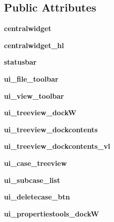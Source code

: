 \subsection*{Public Attributes}
\begin{DoxyCompactItemize}
\item 
\hypertarget{a00105_a2a323cc6e8e271345a42cb3342820d3b}{}\label{a00105_a2a323cc6e8e271345a42cb3342820d3b} 
{\bfseries centralwidget}
\item 
\hypertarget{a00105_a84fbe4915db0698d6779bab59a55b20a}{}\label{a00105_a84fbe4915db0698d6779bab59a55b20a} 
{\bfseries centralwidget\+\_\+hl}
\item 
\hypertarget{a00105_a840ced767970f65402ef894fb5fcc3f3}{}\label{a00105_a840ced767970f65402ef894fb5fcc3f3} 
{\bfseries statusbar}
\item 
\hypertarget{a00105_aa1bd7f326134cd7873cadb8a3e89d866}{}\label{a00105_aa1bd7f326134cd7873cadb8a3e89d866} 
{\bfseries ui\+\_\+file\+\_\+toolbar}
\item 
\hypertarget{a00105_ada862a642c3a9c359564a67539047d12}{}\label{a00105_ada862a642c3a9c359564a67539047d12} 
{\bfseries ui\+\_\+view\+\_\+toolbar}
\item 
\hypertarget{a00105_aaa6b736b767520bf24e89cfaf72ae15f}{}\label{a00105_aaa6b736b767520bf24e89cfaf72ae15f} 
{\bfseries ui\+\_\+treeview\+\_\+dockW}
\item 
\hypertarget{a00105_ae11b22f4f511169e79dd98b5e886890d}{}\label{a00105_ae11b22f4f511169e79dd98b5e886890d} 
{\bfseries ui\+\_\+treeview\+\_\+dockcontents}
\item 
\hypertarget{a00105_a6bf94b92513eaa3732c9dfec3f32697c}{}\label{a00105_a6bf94b92513eaa3732c9dfec3f32697c} 
{\bfseries ui\+\_\+treeview\+\_\+dockcontents\+\_\+vl}
\item 
\hypertarget{a00105_a43692c1dd9ca5ac7d3b92aefb56d3a47}{}\label{a00105_a43692c1dd9ca5ac7d3b92aefb56d3a47} 
{\bfseries ui\+\_\+case\+\_\+treeview}
\item 
\hypertarget{a00105_ab7e73e16ab3e6b27d3d50400bc8adaa9}{}\label{a00105_ab7e73e16ab3e6b27d3d50400bc8adaa9} 
{\bfseries ui\+\_\+subcase\+\_\+list}
\item 
\hypertarget{a00105_ab81dbfc042d78295a9c868c026846575}{}\label{a00105_ab81dbfc042d78295a9c868c026846575} 
{\bfseries ui\+\_\+deletecase\+\_\+btn}
\item 
\hypertarget{a00105_a8507133b9e49326677916d0b69587180}{}\label{a00105_a8507133b9e49326677916d0b69587180} 
{\bfseries ui\+\_\+propertiestools\+\_\+dockW}
\item 

\end{DoxyCompactItemize}
